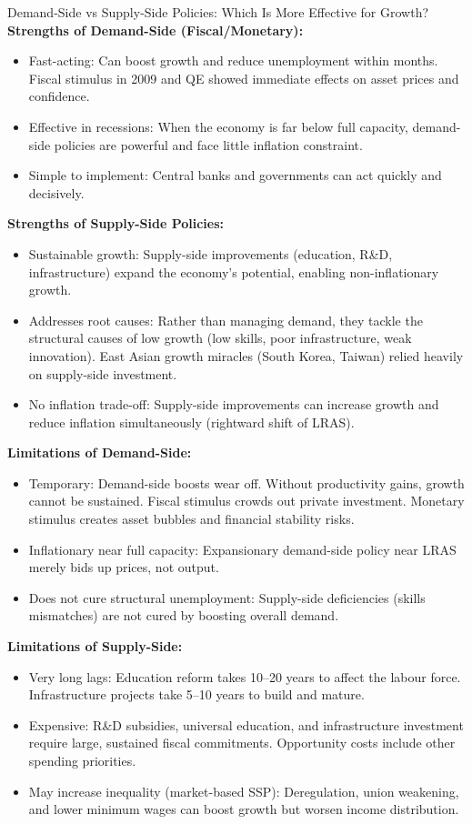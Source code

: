\documentclass[11pt, a4paper, twoside]{book}
\begin{document}
\begin{evaluation}{Demand-Side vs Supply-Side Policies: Which Is More Effective for Growth?}
\textbf{Strengths of Demand-Side (Fiscal/Monetary):}
\begin{itemize}
  \item Fast-acting: Can boost growth and reduce unemployment within months. Fiscal stimulus in 2009 and QE showed immediate effects on asset prices and confidence.
  \item Effective in recessions: When the economy is far below full capacity, demand-side policies are powerful and face little inflation constraint.
  \item Simple to implement: Central banks and governments can act quickly and decisively.
\end{itemize}

\textbf{Strengths of Supply-Side Policies:}
\begin{itemize}
  \item Sustainable growth: Supply-side improvements (education, R\&D, infrastructure) expand the economy's potential, enabling non-inflationary growth.
  \item Addresses root causes: Rather than managing demand, they tackle the structural causes of low growth (low skills, poor infrastructure, weak innovation). East Asian growth miracles (South Korea, Taiwan) relied heavily on supply-side investment.
  \item No inflation trade-off: Supply-side improvements can increase growth and reduce inflation simultaneously (rightward shift of LRAS).
\end{itemize}

\textbf{Limitations of Demand-Side:}
\begin{itemize}
  \item Temporary: Demand-side boosts wear off. Without productivity gains, growth cannot be sustained. Fiscal stimulus crowds out private investment. Monetary stimulus creates asset bubbles and financial stability risks.
  \item Inflationary near full capacity: Expansionary demand-side policy near LRAS merely bids up prices, not output.
  \item Does not cure structural unemployment: Supply-side deficiencies (skills mismatches) are not cured by boosting overall demand.
\end{itemize}

\textbf{Limitations of Supply-Side:}
\begin{itemize}
  \item Very long lags: Education reform takes 10--20 years to affect the labour force. Infrastructure projects take 5--10 years to build and mature.
  \item Expensive: R\&D subsidies, universal education, and infrastructure investment require large, sustained fiscal commitments. Opportunity costs include other spending priorities.
  \item May increase inequality (market-based SSP): Deregulation, union weakening, and lower minimum wages can boost growth but worsen income distribution.
\end{itemize}


\end{evaluation}
\end{document}
